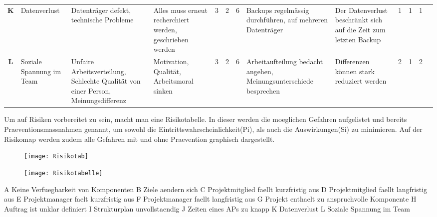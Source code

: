\begin{table}[H]
{\begin{tabular}{|c|>{\HY\RaggedRight}p{2.5cm}|>{\HY\RaggedRight}p{2.5cm}|>{\HY\RaggedRight}p{2.5cm}|c|c|c|>{\HY\RaggedRight}p{3cm}|>{\HY\RaggedRight}p{3cm}|c|c|c|c|}
\textbf{K}			&Datenverlust									&Datenträger defekt, technische Probleme												&Alles muss erneut recherchiert werden, geschrieben werden		&3			&2			&\cellcolor{orange}6				&Backups regelmässig durchführen, auf mehreren Datenträger												&Der Datenverlust beschränkt sich auf die Zeit zum letzten Backup												&1				&1				&\cellcolor{dgruen}1		&\\
\rowcolor{grau}
\textbf{L}			&Soziale Spannung im Team						&Unfaire Arbeitsverteilung, Schlechte Qualität von einer Person, Meinungsdifferenz		&Motivation, Qualität, Arbeitsmoral sinken						&3			&2			&\cellcolor{orange}6				&Arbeitaufteilung bedacht angehen, Meinungsunterschiede besprechen										&Differenzen können stark reduziert werden																	&2				&1				&\cellcolor{hgruen}2		&\\
\end{tabular}
}
\end{table}


\newpage
Um auf Risiken vorbereitet zu sein, macht man eine Risikotabelle. In dieser werden die moeglichen Gefahren aufgelistet und bereits Praeventionsmassnahmen genannt, um sowohl die Eintrittswahrscheinlichkeit(Pi), als auch die Auswirkungen(Si) zu minimieren. Auf der Risikomap werden zudem alle Gefahren mit und ohne Praevention graphisch dargestellt.

\begin{figure}[H]
	\centering
	\texttt{[image: Risikotab]}
	\label{fig:Risikodiagramm}
\end{figure}

\begin{figure}[H]
	\centering
	\texttt{[image: Risikotabelle]}
	\label{fig:Tabelle}
\end{figure}
A 	Keine Verfuegbarkeit von Komponenten \newline 
B 	Ziele aendern sich\newline 
C 	Projektmitglied faellt kurzfristig aus\newline 
D	Projektmitglied faellt langfristig aus\newline 
E 	Projektmanager faelt kurzfristig aus\newline 
F 	Projektmanager faellt langfristig aus\newline 
G	Projekt enthaelt zu anspruchvolle Komponente\newline 
H	Auftrag ist unklar definiert\newline 
I	Strukturplan unvollstaendig\newline 
J	Zeiten eines APs zu knapp\newline 
K	Datenverlust\newline 
L	Soziale Spannung im Team\newline 
